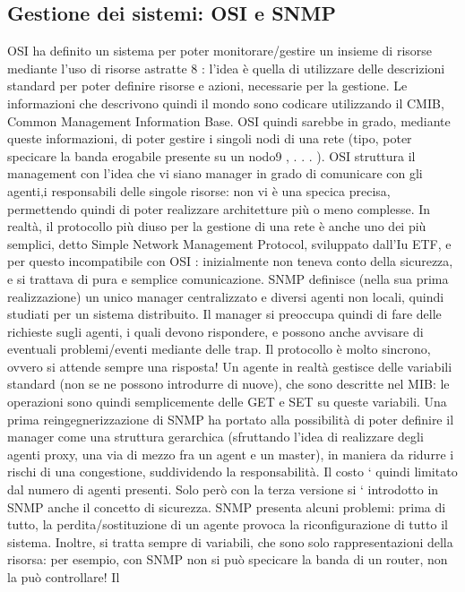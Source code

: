 \subsection{Gestione dei sistemi: OSI e SNMP}
OSI ha definito un sistema per poter monitorare/gestire un insieme di risorse
mediante l'uso di risorse astratte 8 : l'idea è quella di utilizzare delle descrizioni
standard per poter definire risorse e azioni, necessarie per la gestione. Le informazioni che descrivono quindi il mondo
sono codicare utilizzando il CMIB,
Common Management Information Base. OSI quindi sarebbe in grado, mediante queste informazioni, di poter gestire i
singoli nodi di una rete (tipo, poter
specicare la banda erogabile presente su un nodo9 , . . . ). OSI struttura il management con l'idea che vi siano manager
in grado di comunicare con gli agenti,i
responsabili delle singole risorse: non vi è una specica precisa, permettendo
quindi di poter realizzare architetture più o meno complesse.
In realtà, il protocollo più diuso per la gestione di una rete è anche uno
dei più semplici, detto Simple Network Management Protocol, sviluppato dall'Iu
ETF, e per questo incompatibile con OSI : inizialmente non teneva conto della
sicurezza, e si trattava di pura e semplice comunicazione.
SNMP definisce (nella sua prima realizzazione) un unico manager centralizzato e diversi agenti non locali, quindi studiati
per un sistema distribuito. Il
manager si preoccupa quindi di fare delle richieste sugli agenti, i quali devono
rispondere, e possono anche avvisare di eventuali problemi/eventi mediante delle
trap. Il protocollo è molto sincrono, ovvero si attende sempre una risposta!
Un agente in realtà gestisce delle variabili standard (non se ne possono
introdurre di nuove), che sono descritte nel MIB: le operazioni sono quindi
semplicemente delle GET e SET su queste variabili.
Una prima reingegnerizzazione di SNMP ha portato alla possibilità di poter
definire il manager come una struttura gerarchica (sfruttando l'idea di realizzare
degli agenti proxy, una via di mezzo fra un agent e un master), in maniera da
ridurre i rischi di una congestione, suddividendo la responsabilità. Il costo `
quindi limitato dal numero di agenti presenti. Solo però con la terza versione si
` introdotto in SNMP anche il concetto di sicurezza.
SNMP presenta alcuni problemi: prima di tutto, la perdita/sostituzione di
un agente provoca la riconfigurazione di tutto il sistema. Inoltre, si tratta sempre di variabili, che sono solo
rappresentazioni della risorsa: per esempio, con
SNMP non si può specicare la banda di un router, non la può controllare! Il
